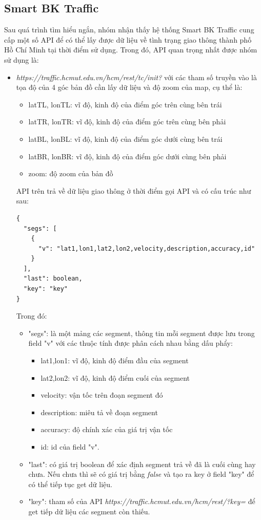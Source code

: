 \subsection{Smart BK Traffic}
Sau quá trình tìm hiểu ngắn, nhóm nhận thấy hệ thống Smart BK Traffic cung cấp một số API để có thể lấy được dữ liệu về tình trạng giao thông thành phố Hồ Chí Minh tại thời điểm sử dụng. Trong đó, API quan trọng nhất được nhóm sử dụng là:
\begin{itemize}
    \item \textit{https://traffic.hcmut.edu.vn/hcm/rest/tc/init?} với các tham số truyền vào là tọa độ của 4 góc bản đồ cần lấy dữ liệu và độ zoom của map, cụ thể là:
\begin{itemize}
    \item latTL, lonTL: vĩ độ, kinh độ của điểm góc trên cùng bên trái
    \item latTR, lonTR: vĩ độ, kinh độ của điểm góc trên cùng bên phải
    \item latBL, lonBL: vĩ độ, kinh độ của điểm góc dưới cùng bên trái
    \item latBR, lonBR: vĩ độ, kinh độ của điểm góc dưới cùng bên phải
    \item zoom: độ zoom của bản đồ
\end{itemize}
    API trên trả về dữ liệu giao thông ở thời điểm gọi API và có cấu trúc như sau:
\begin{lstlisting}[language=XML]
{
  "segs": [
    {
      "v": "lat1,lon1,lat2,lon2,velocity,description,accuracy,id"
    }
  ],
  "last": boolean,
  "key": "key"
}
\end{lstlisting}
    Trong đó:
    \begin{itemize}
        \item "segs": là một mảng các segment, thông tin mỗi segment được lưu trong field "v" với các thuộc tính được phân cách nhau bằng dấu phẩy:
        \begin{itemize}
            \item lat1,lon1: vĩ độ, kinh độ điểm đầu của segment
            \item lat2,lon2: vĩ độ, kinh độ điểm cuối của segment
            \item velocity: vận tốc trên đoạn segment đó 
            \item description: miêu tả về đoạn segment
            \item accuracy: độ chính xác của giá trị vận tốc
            \item id: id của field "v".
        \end{itemize}
    
    \item "last": có giá trị boolean để xác định segment trả về đã là cuối cùng hay chưa. Nếu chưa thì sẽ có giá trị bằng \textit{false} và tạo ra key ở field "key" để có thể tiếp tục get dữ liệu.
    \item "key": tham số của API \textit{https://traffic.hcmut.edu.vn/hcm/rest/?key=} để get tiếp dữ liệu các segment còn thiếu.
    \end{itemize}
\end{itemize}
